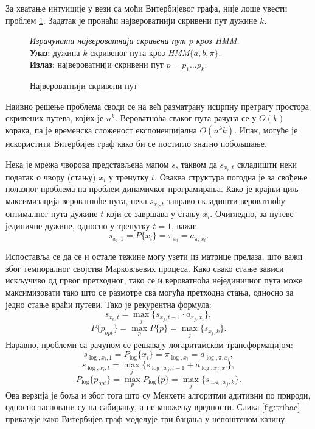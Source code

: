 \documentclass[12pt,oneside]{memoir}
\newenvironment{problem}[1][!ht]
{\renewcommand{\algorithmcfname}{Проблем}
\begin{figure}[!ht]
\centering
  \begin{minipage}{.94\linewidth}
	\begin{algorithm}[#1]%
  }{\end{algorithm}
  \end{minipage}
\end{figure}}
\begin{document}
\begin{CJK}{UTF8}{ipxm}
За хватање интуиције у вези са моћи Витербијевог графа, није лоше увести проблем \ref{prob:maxput}. Задатак је пронаћи највероватнији скривени пут дужине $k$.

\begin{problem}[H]
  \SetAlgoLined
  \textit{Израчунати највероватнији скривени пут $p$ кроз \textit{HMM}.}\\
  \textbf{Улаз}: дужина $k$ скривеног пута кроз \textit{HMM}$\{a, b, \pi\}$.\\
  \textbf{Излаз}: највероватнији скривени пут $p = p_1...p_k$.
  \caption{Највероватнији скривени пут}
  \label{prob:maxput}
\end{problem}

Наивно решење проблема своди се на већ разматрану исцрпну претрагу простора скривених путева, којих је $n^k$. Вероватноћа сваког пута рачуна се у $O(k)$ корака, па је временска сложеност експоненцијална $O(n^k k)$. Ипак, могуће је искористити Витербијев граф како би се постигло знатно побољшање.

Нека је мрежа чворова представљена мапом $s$, таквом да $s_{x_i, t}$ складишти неки податак о чвору (стању) $x_i$ у тренутку $t$. Оваква структура погодна је за свођење полазног проблема на проблем динамичког програмирања. Како је крајњи циљ максимизација вероватноће пута, нека $s_{x_i, t}$ заправо складишти вероватноћу оптималног пута дужине $t$ који се завршава у стању $x_i$. Очигледно, за путеве јединичне дужине, односно у тренутку $t=1$, важи: $$s_{x_i, 1} = P\{x_i\} = \pi_{x_i} = a_{\pi, x_i}.$$

Испоставља се да се и остале тежине могу узети из матрице прелаза, што важи због темпоралног својства Марковљевих процеса. Како свако стање зависи искључиво од првог претходног, тако се и вероватноћа нејединичног пута може максимизовати тако што се размотре сва могућа претходна стања, односно за једно стање краћи путеви. Тако је рекурентна формула: $$s_{x_i, t} = \max_j \{s_{x_j, t-1} \cdot a_{x_j, x_i}\},$$ $$P\{p_{opt}\} = \max_p P\{p\} = \max_j \{s_{x_j, k}\}.$$ Наравно, проблеми са рачуном се решавају логаритамском трансформацијом: $$s_{\log, x_i, 1} = P_{\log}\{x_i\} = \pi_{\log, x_i} = a_{\log, \pi, x_i},$$ $$s_{\log, x_i, t} = \max_j \{s_{\log, x_j, t-1} + a_{\log, x_j, x_i}\},$$ $$P_{\log}\{p_{opt}\} = \max_p P_{\log}\{p\} = \max_j \{s_{\log, x_j, k}\}.$$ Ова верзија је боља и због тога што су Менхетн алгоритми адитивни по природи, односно засновани су на сабирању, а не множењу вредности. Слика \ref{fig:tribac} приказује како Витербијев граф моделује три бацања у непоштеном казину.


\end{CJK}
\end{document}
